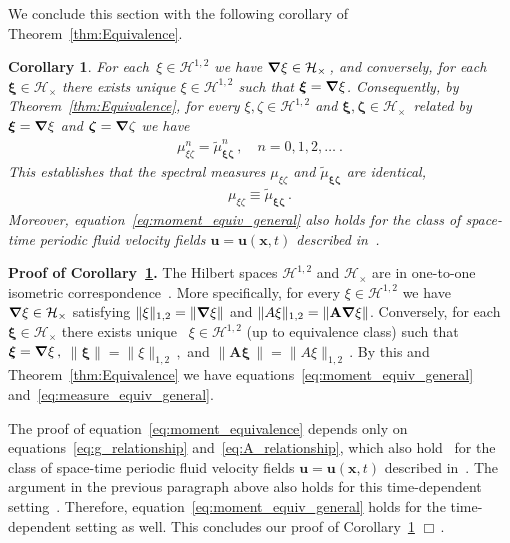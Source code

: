 \documentclass[english,12pt,jmp,graphicx]{revtex4-1}
\newcommand{\vecu}{\boldsymbol{u}}
\newcommand{\vecx}{\boldsymbol{x}}
\newcommand{\vecxi}{\boldsymbol{\xi}}
\newcommand{\veczeta}{\boldsymbol{\zeta}}
\newcommand{\thmref}[1]{Theorem~\ref{#1}}
\newcommand{\corref}[1]{Corollary~\ref{#1}}
\newcommand{\bnabla}{\mbox{\boldmath${\nabla}$}}
\newcommand{\Hs}{\mathscr{H}}
\newcommand{\Hc}{\mathcal{H}}
\newtheorem{corollary}[theorem]{Corollary}
\newcommand{\Mb}{\mathbf{M}}
\newcommand{\Ab}{\mathbf{A}}
\begin{document}
We conclude this section with the following corollary of
\thmref{thm:Equivalence}. 
%
\begin{corollary}\label{cor:Equivalence}
%
For each $\,\xi\in\Hs^{1,2}$ we have $\bnabla\xi\in\Hc_\times\,$, and  
conversely, for each $\vecxi\in\Hc_\times$ there exists unique 
$\xi\in\Hs^{1,2}$ such that 
$\vecxi=\bnabla\xi$.
%
% 
Consequently,
by \thmref{thm:Equivalence}, for every $\xi,\zeta\in\Hs^{1,2}$ and
$\vecxi,\veczeta\in\Hc_\times\,$ related by $\vecxi=\bnabla\xi$ and
$\veczeta=\bnabla\zeta$ we have 
%
\begin{align}\label{eq:moment_equiv_general}
\mu_{\xi\zeta}^n=\tilde{\mu}_{\vecxi\veczeta}^n\,,
\quad
n=0,1,2,\ldots \ .
\end{align}
This establishes 
that the spectral measures $\mu_{\xi\zeta}$ and 
$\tilde{\mu}_{\vecxi\veczeta}$ are \emph{identical}, 
%
\begin{align}\label{eq:measure_equiv_general}
\mu_{\xi\zeta}\equiv\tilde{\mu}_{\vecxi\veczeta}\,.
\end{align}
%
Moreover, equation~\eqref{eq:moment_equiv_general} also holds 
for the class of space-time periodic fluid velocity fields 
$\vecu=\vecu(\vecx,t)$ described in~\cite{Murphy:ADSTPF-2017}. 
%
%
\end{corollary}
%

\noindent
\textbf{Proof of \corref{cor:Equivalence}.}
The Hilbert spaces $\Hs^{1,2}$ and $\Hc_\times$ are in one-to-one
isometric correspondence~\cite{Murphy:ADSTPF-2017}. More 
specifically, for every $\xi\in\Hs^{1,2}$ we have 
$\bnabla\xi\in\Hc_\times$ satisfying $\|\xi\|_{1,2}=\|\bnabla\xi\|$ 
and $\|A\xi\|_{1,2}=\|\Ab\bnabla\xi\|$. Conversely, for each 
$\vecxi\in\Hc_\times$ there exists unique~\cite{Murphy:ADSTPF-2017}
$\xi\in\Hs^{1,2}$ (up to equivalence class) such that 
$\vecxi=\bnabla\xi\,,$ $\|\vecxi\|=\|\xi\|_{1,2}\,,$ and 
$\|\Ab\vecxi\,\|=\|A\xi\|_{1,2}\,.$ By this and 
\thmref{thm:Equivalence} we have 
equations~\eqref{eq:moment_equiv_general} 
and~\eqref{eq:measure_equiv_general}.



The proof of equation~\eqref{eq:moment_equivalence} depends only 
on equations~\eqref{eq:g_relationship} and~\eqref{eq:A_relationship}, 
which also hold~\cite{Murphy:ADSTPF-2017} for the class of space-time
periodic fluid velocity fields $\vecu=\vecu(\vecx,t)$ described 
in~\cite{Murphy:ADSTPF-2017}. 
The argument in the previous paragraph above also holds for this
time-dependent setting~\cite{Murphy:ADSTPF-2017}. Therefore, 
equation~\eqref{eq:moment_equiv_general} holds for the time-dependent 
setting as well. This concludes our proof of \corref{cor:Equivalence} $\Box\,.$
\end{document}
